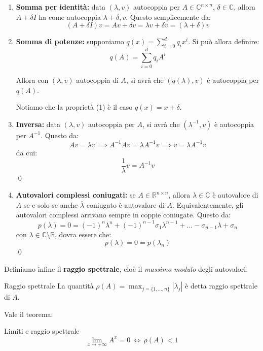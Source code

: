 \documentclass[a4paper,11pt]{article}
\begin{document}
\begin{enumerate}
	\item \textbf{Somma per identità:} data $(\lambda, v)$ autocoppia per $A \in \mathbb{C}^{n \times n}$, $\delta \in \mathbb{C}$, allora $A + \delta I$ ha come autocoppia $\lambda + \delta, v$.
		Questo semplicemente da:
		$$
			(A + \delta I) v = A v + \delta v = \lambda v + \delta v = (\lambda + \delta) v
		$$

	\item \textbf{Somma di potenze:} supponiamo $q(x) = \sum_{i = 0}^d q_i x^i$. Si può allora definire:
		$$
		q(A) = \sum_{i = 0}^d q_i A^i
		$$
		
		Allora con $(\lambda, v)$ autocoppia di $A$, si avrà che $(q(\lambda), v)$ è autocoppia per $q(A)$.

		Notiamo che la proprietà (1) è il caso $q(x) = x + \delta$.

	\item \textbf{Inversa:} data $(\lambda, v)$ autocoppia per $A$, si avrà che $(\lambda^{-1}, v)$ è autocoppia per $A^{-1}$.
		Questo da:
		$$
			A v = \lambda v \implies A^{-1} A v = \lambda A^{-1} v \implies v = \lambda A^{-1} v
		$$
		da cui:
		$$
		\frac{1}{\lambda} v = A^{-1} v
		$$ \qed

	\item \textbf{Autovalori complessi coniugati:} se $A \in \mathbb{R}^{n \times n}$, allora $\lambda \in \mathbb{C}$ è autovalore di $A$ se e solo se anche $\overline{\lambda}$ coniugato è autovalore di $A$.
		Equivalentemente, gli autovalori complessi arrivano sempre in coppie coniugate.
		Questo da:
		$$
		p(\lambda) = 0 = (-1)^n \lambda^n + (-1)^{n - 1} \sigma_1 \lambda^{n - 1} + ... - \sigma_{n - 1} \lambda + \sigma_{n}
		$$
		con $\lambda \in \mathbb{C} \setminus \mathbb{R}$, dovra essere che:
		$$
		p(\lambda) = 0 = p(\lambda_n)
		$$ \qed

\end{enumerate}

Definiamo infine il \textbf{raggio spettrale}, cioè il \textit{massimo modulo} degli autovalori.
\begin{definition}{Raggio spettrale}
	La quantità $\rho(A) = \max_{j = \{1,...,n\}} |\lambda_j|$ è detta raggio spettrale di $A$.
\end{definition}
Vale il teorema:
\begin{theorem}{Limiti e raggio spettrale}
	$$\lim_{x \rightarrow + \infty} A^x = 0 \, \Leftrightarrow \, \rho(A) < 1$$
\end{theorem}
\end{document}
